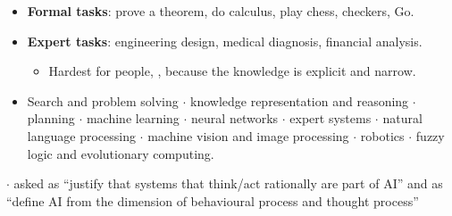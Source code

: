 {\begin{itemize}
\begin{itemize}
          Moravec's paradox.
  \end{itemize}
  \item \textbf{Formal tasks}: prove a theorem, do calculus, play chess, checkers, Go.
  \item \textbf{Expert tasks}: engineering design, medical diagnosis, financial analysis.
  \begin{itemize}
    \item Hardest for people, , because the knowledge is
          explicit and narrow.
  \end{itemize}
\end{itemize}
\begin{itemize}
  \item Search and problem solving $\cdot$ knowledge representation and reasoning $\cdot$
        planning $\cdot$ machine learning $\cdot$ neural networks $\cdot$ expert systems
        $\cdot$ natural language processing $\cdot$ machine vision and image processing
        $\cdot$ robotics $\cdot$ fuzzy logic and evolutionary computing.
\end{itemize}}

\vspace{2pt}

{\color{sub}\footnotesize {} \gap$\cdot$\gap
asked as ``justify that systems that think/act rationally are part of AI'' and as
``define AI from the dimension of behavioural process and thought process''}

